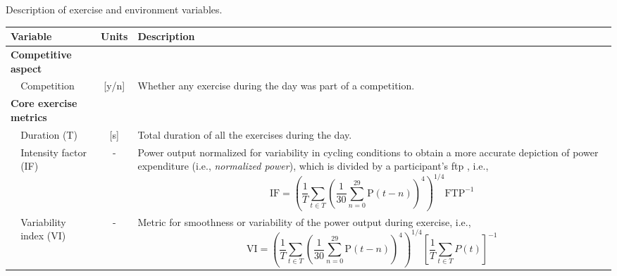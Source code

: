 \documentclass[11pt,a4paper]{article}
\begin{document}
\newpage
\renewcommand{\arraystretch}{1.25}
\begin{threeparttable}[hbtp]
    \caption{Description of exercise and environment variables.}
    \label{tab:reg-variables}
    \footnotesize
    \centering
    \begin{tabular}{l p{3.5cm} c p{11.2cm}}
        \toprule
        \multicolumn{2}{l}{\textbf{Variable}} & \textbf{Units} & \textbf{Description}\\
        \midrule
        \multicolumn{2}{l}{\textbf{Competitive aspect}}\\
        & Competition & [y/n] & Whether any exercise during the day was part of a competition.\\
        \multicolumn{2}{l}{\textbf{Core exercise metrics}}\\
        & Duration (T) & [s] & Total duration of all the exercises during the day.\\
        & Intensity factor (IF) & - & Power output normalized for variability in cycling conditions to obtain a more accurate depiction of power expenditure (i.e., \textit{normalized power}), which is divided by a participant's \gls{ftp} \cite{1937716155}, i.e., \begin{equation}\text{IF} = \left( \frac{1}{T} \sum_{t\in T} \left( \frac{1}{30} \sum_{n=0}^{29} \text{P} (t-n) \right)^4\right)^{1/4} \text{FTP}^{-1}\end{equation}\\
        & Variability index (VI) & - & Metric for smoothness or variability of the power output during exercise, i.e., \begin{equation}\text{VI} = \left( \frac{1}{T} \sum_{t\in T} \left( \frac{1}{30} \sum_{n=0}^{29} \text{P} (t-n) \right)^4\right)^{1/4} \left[\frac{1}{T}\sum_{t\in T} P(t)\right]^{-1} \end{equation} \\


\end{tabular}
\end{threeparttable}
\end{document}
